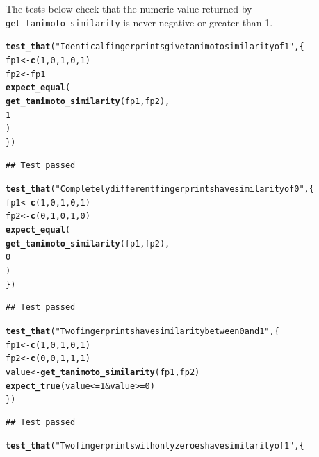 \documentclass[a4paper,11pt]{article}\usepackage[]{graphicx}\usepackage[]{xcolor}
\makeatletter
\newcommand{\hlnum}[1]{\textcolor[rgb]{0.686,0.059,0.569}{#1}}%
\newcommand{\hlsng}[1]{\textcolor[rgb]{0.192,0.494,0.8}{#1}}%
\newcommand{\hlopt}[1]{\textcolor[rgb]{0,0,0}{#1}}%
\newcommand{\hldef}[1]{\textcolor[rgb]{0.345,0.345,0.345}{#1}}%
\newcommand{\hlkwb}[1]{\textcolor[rgb]{0.69,0.353,0.396}{#1}}%
\newcommand{\hlkwd}[1]{\textcolor[rgb]{0.737,0.353,0.396}{\textbf{#1}}}%
\newenvironment{kframe}{%
 \def\at@end@of@kframe{}%
 \ifinner\ifhmode%
  \def\at@end@of@kframe{\end{minipage}}%
  \begin{minipage}{\columnwidth}%
 \fi\fi%
 \def\FrameCommand##1{\hskip\@totalleftmargin \hskip-\fboxsep
 \colorbox{shadecolor}{##1}\hskip-\fboxsep
     \hskip-\linewidth \hskip-\@totalleftmargin \hskip\columnwidth}%
 \MakeFramed {\advance\hsize-\width
   \@totalleftmargin\z@ \linewidth\hsize
   \@setminipage}}%
 {\par\unskip\endMakeFramed%
 \at@end@of@kframe}
\newenvironment{knitrout}{}{} %
\newcommand{\code}[1]{\texttt{#1}}
\makeatother
\begin{document}
\begin{enumerate}
The tests below check that the numeric value returned by \code{get\_tanimoto\_similarity} is never negative or greater than 1.

\begin{knitrout}
\color{fgcolor}\begin{kframe}
\begin{alltt}
\hlkwd{test_that}\hldef{(}\hlsng{"Identical fingerprints give tanimoto similarity of 1"}\hldef{, \{}
  \hldef{fp1} \hlkwb{<-} \hlkwd{c}\hldef{(}\hlnum{1}\hldef{,} \hlnum{0}\hldef{,} \hlnum{1}\hldef{,} \hlnum{0}\hldef{,} \hlnum{1}\hldef{)}
  \hldef{fp2} \hlkwb{<-} \hldef{fp1}
  \hlkwd{expect_equal}\hldef{(}
    \hlkwd{get_tanimoto_similarity}\hldef{(fp1, fp2),}
    \hlnum{1}
  \hldef{)}
\hldef{\})}
\end{alltt}
\begin{verbatim}
## Test passed
\end{verbatim}
\begin{alltt}
\hlkwd{test_that}\hldef{(}\hlsng{"Completely different fingerprints have similarity of 0"}\hldef{, \{}
  \hldef{fp1} \hlkwb{<-} \hlkwd{c}\hldef{(}\hlnum{1}\hldef{,} \hlnum{0}\hldef{,} \hlnum{1}\hldef{,} \hlnum{0}\hldef{,} \hlnum{1}\hldef{)}
  \hldef{fp2} \hlkwb{<-} \hlkwd{c}\hldef{(}\hlnum{0}\hldef{,} \hlnum{1}\hldef{,} \hlnum{0}\hldef{,} \hlnum{1}\hldef{,} \hlnum{0}\hldef{)}
  \hlkwd{expect_equal}\hldef{(}
    \hlkwd{get_tanimoto_similarity}\hldef{(fp1, fp2),}
    \hlnum{0}
  \hldef{)}
\hldef{\})}
\end{alltt}
\begin{verbatim}
## Test passed
\end{verbatim}
\begin{alltt}
\hlkwd{test_that}\hldef{(}\hlsng{"Two fingerprints have similarity between 0 and 1"}\hldef{, \{}
  \hldef{fp1} \hlkwb{<-} \hlkwd{c}\hldef{(}\hlnum{1}\hldef{,} \hlnum{0}\hldef{,} \hlnum{1}\hldef{,} \hlnum{0}\hldef{,} \hlnum{1}\hldef{)}
  \hldef{fp2} \hlkwb{<-} \hlkwd{c}\hldef{(}\hlnum{0}\hldef{,} \hlnum{0}\hldef{,} \hlnum{1}\hldef{,} \hlnum{1}\hldef{,} \hlnum{1}\hldef{)}
  \hldef{value} \hlkwb{<-} \hlkwd{get_tanimoto_similarity}\hldef{(fp1, fp2)}
  \hlkwd{expect_true}\hldef{(value} \hlopt{<=} \hlnum{1} \hlopt{&} \hldef{value} \hlopt{>=} \hlnum{0}\hldef{)}
\hldef{\})}
\end{alltt}
\begin{verbatim}
## Test passed
\end{verbatim}
\begin{alltt}
\hlkwd{test_that}\hldef{(}\hlsng{"Two fingerprints with only zeroes have similarity of 1"}\hldef{, \{}

\end{alltt}
\end{kframe}
\end{knitrout}
\end{enumerate}
\end{document}
